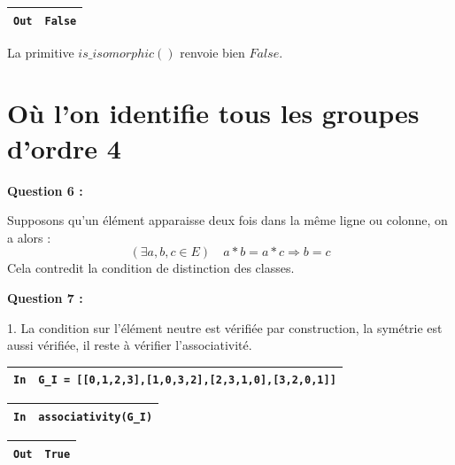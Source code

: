 \documentclass[titlepage]{article}
\begin{document}
    \begin{tabularx}{11.5cm}{|p{0.60cm}|X|}
        \hline
        \verb|Out|
        & 
        \verb|False|
        \\
        \hline
    \end{tabularx}\newline

    La primitive $is\_isomorphic()$ renvoie bien $False$.

    \section{Où l’on identifie tous les groupes d’ordre 4}
    \textbf{Question 6 :}

    Supposons qu'un élément apparaisse deux fois dans la même ligne ou colonne, on a alors :
    \[(\exists a, b, c \in E) \quad a*b=a*c \Longrightarrow b = c\]
    Cela contredit la condition de distinction des classes.\newline

    \textbf{Question 7 :}

    1. La condition sur l'élément neutre est vérifiée par construction, la symétrie est aussi vérifiée, il reste à vérifier l'associativité.\newline
    
    \begin{tabularx}{11.5cm}{|p{0.60cm}|X|}
        \hline
        \verb|In|
        & 
        \verb|G_I = [[0,1,2,3],[1,0,3,2],[2,3,1,0],[3,2,0,1]]|
        \\
        \hline
    \end{tabularx}\newline
    \begin{tabularx}{11.5cm}{|p{0.60cm}|X|}
        \hline
        \verb|In|
        & 
        \verb|associativity(G_I)|
        \\
        \hline
    \end{tabularx}\newline
    \begin{tabularx}{11.5cm}{|p{0.60cm}|X|}
        \hline
        \verb|Out|
        & 
        \verb|True|
        \\
        \hline
    \end{tabularx}\newline\newline
\end{document}
